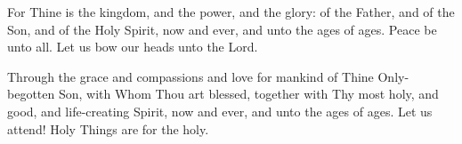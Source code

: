 \begin{liturgicaltext}
    \priest For Thine is the kingdom, and the power, and the glory: of the Father, and of the Son, and of the Holy Spirit, now and ever, and unto the ages of ages. 
    \choir {}
    \priest Peace be unto all.
    \choir {}
    \deacon Let us bow our heads unto the Lord.
    \choir {}
    \item[] 
    \priest Through the grace and compassions and love for mankind of Thine Only-begotten Son, with Whom Thou art blessed, together with Thy most holy, and good, and life-creating Spirit, now and ever, and unto the ages of ages.
    \choir {}
    \deacon Let us attend!
    \priest Holy Things are for the holy.
    \choir
\end{liturgicaltext}
